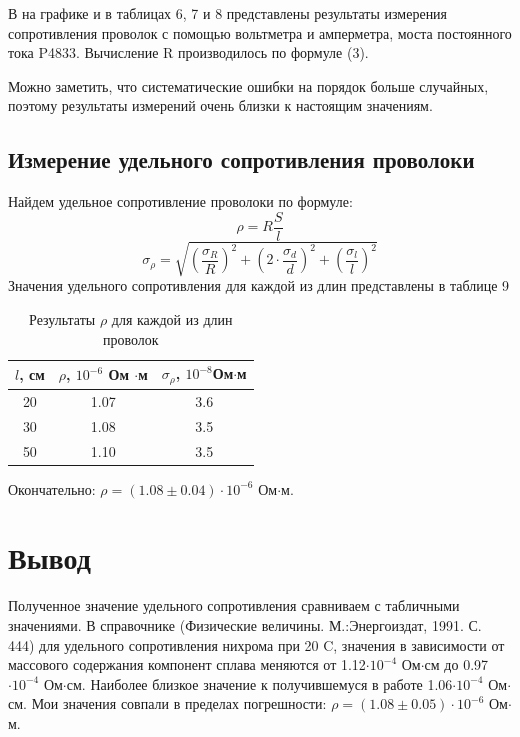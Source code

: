 \documentclass[a4paper,12pt]{article}
\begin{document}
В на графике и в таблицах 6, 7 и 8 представлены результаты измерения сопротивления проволок с помощью вольтметра и амперметра, моста постоянного тока P4833. Вычисление R производилось по формуле (3).

Можно заметить, что систематические ошибки на порядок больше случайных, поэтому  результаты измерений очень близки к настоящим значениям.

\subsection{Измерение удельного сопротивления проволоки}

Найдем удельное сопротивление проволоки по формуле:
\begin{equation}
\rho = R\frac{S}{l}
\end{equation}
\begin{equation}
\sigma_{\rho} = \sqrt{\left( \frac{\sigma_R}{R} \right)^2+\left( 2 \cdot \frac{\sigma_d}{d} \right)^2+\left(\frac{\sigma_l}{l} \right)^2}
\end{equation}
Значения удельного сопротивления для каждой из длин представлены в таблице 9

\begin{table}[H]
\centering
\caption{Результаты $\rho$ для каждой из длин проволок}
\begin{tabular}{|c|c|c|}
\hline
$l$, см & $\rho$, $10^{-6}$ Ом $\cdot$м &$\sigma_{\rho}$, $10^{-8}$Ом$\cdot$м \\
\hline
20 & 1.07 & 3.6 \\
\hline
30 & 1.08 & 3.5 \\
\hline
50 & 1.10 & 3.5 \\
\hline
\end{tabular}
\end{table}

Окончательно: $\rho = (1.08 \pm 0.04)\cdot 10^{-6}$ Ом$\cdot$м.

\section{Вывод}
Полученное значение удельного сопротивления сравниваем с табличными значениями. В справочнике (Физические величины. М.:Энергоиздат, 1991. С. 444) для удельного сопротивления нихрома при 20 \textdegree C, значения в зависимости от массового содержания компонент сплава меняются от 1.12$\cdot10^{-4}$ Ом$\cdot$см до 0.97$\cdot10^{-4}$ Ом$\cdot$см. Наиболее близкое значение к получившемуся в работе 1.06$\cdot10^{-4}$ Ом$\cdot$см.
Мои значения совпали в пределах погрешности: $\rho = (1.08 \pm 0.05)\cdot 10^{-6}$ Ом$\cdot$м.
\end{document}
